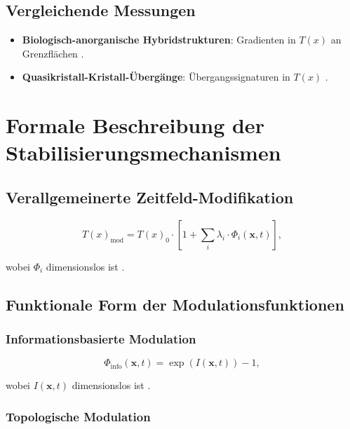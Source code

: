 \documentclass[12pt,a4paper]{article}
\newcommand{\Tfield}{T(x)}
\begin{document}
	\subsection{Vergleichende Messungen}
	
	\begin{itemize}
		\item \textbf{Biologisch-anorganische Hybridstrukturen}: Gradienten in $\Tfield$ an Grenzflächen \cite{pascher_nateinheiten_2025}.
		\item \textbf{Quasikristall-Kristall-Übergänge}: Übergangssignaturen in $\Tfield$ \cite{pascher_nateinheiten_2025}.
	\end{itemize}
	
	\section{Formale Beschreibung der Stabilisierungsmechanismen}
	
	\subsection{Verallgemeinerte Zeitfeld-Modifikation}
	
	\begin{equation}
		\Tfield_{\text{mod}} = \Tfield_0 \cdot \left[ 1 + \sum_i \lambda_i \cdot \Phi_i(\mathbf{x}, t) \right],
	\end{equation}
	
	wobei $\Phi_i$ dimensionslos ist \cite{pascher_nateinheiten_2025}.
	
	\subsection{Funktionale Form der Modulationsfunktionen}
	
	\subsubsection{Informationsbasierte Modulation}
	
	\begin{equation}
		\Phi_{\text{info}}(\mathbf{x}, t) = \exp\left(I(\mathbf{x}, t)\right) - 1,
	\end{equation}
	
	wobei $I(\mathbf{x}, t)$ dimensionslos ist \cite{pascher_nateinheiten_2025}.
	
	\subsubsection{Topologische Modulation}
	
\end{document}
